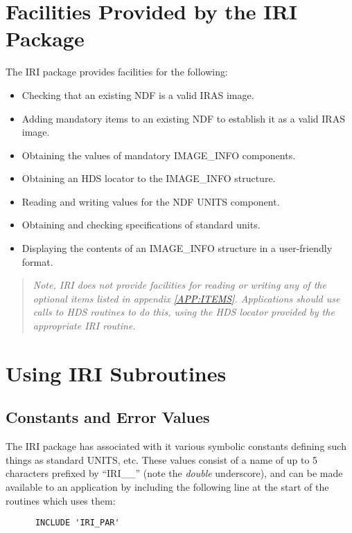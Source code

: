 \section{Facilities Provided by the IRI Package}
The IRI package provides facilities for the following:
\begin{itemize}
\item Checking that an existing NDF is a valid IRAS image.
\item Adding mandatory items to an existing NDF to establish it as a valid
IRAS image.
\item Obtaining the values of mandatory IMAGE\_INFO components.
\item Obtaining an HDS locator to the IMAGE\_INFO structure.
\item Reading and writing values for the NDF UNITS component.
\item Obtaining and checking specifications of standard units.
\item Displaying the contents of an IMAGE\_INFO structure in a user-friendly
format.
\end{itemize}

\begin{quote}
\begin{center}
{\em
Note, IRI {\em does not} provide facilities for reading or writing any of the
optional items listed in appendix \ref{APP:ITEMS}. Applications should use calls
to HDS routines to do this, using the HDS locator provided by the appropriate
IRI routine.
}
\end{center}
\end{quote}


\section{Using IRI Subroutines}

\subsection {Constants and Error Values}
\label {SEC:CON}
The IRI package has associated with it various symbolic constants defining such
things as standard UNITS, etc. These values consist of a name of up to 5
characters prefixed by ``IRI\_\_''  (note the {\em double} underscore), and can
be made available to an application by including the following line at the
start of the routines which uses them:

\begin{verbatim}
      INCLUDE 'IRI_PAR'
\end{verbatim}

